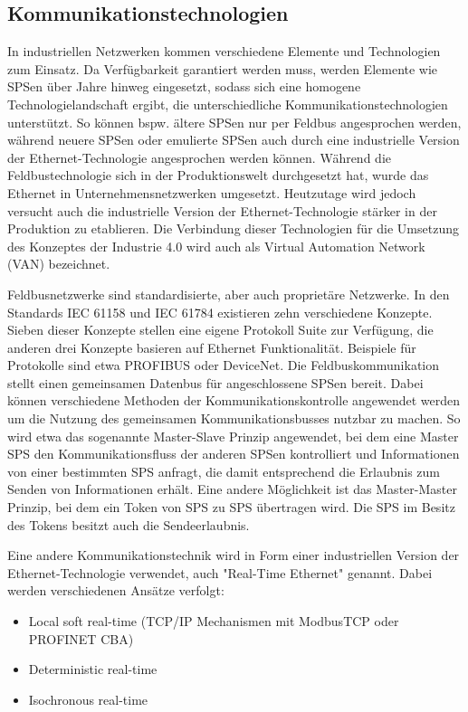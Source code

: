 \subsection{Kommunikationstechnologien}
In industriellen Netzwerken kommen verschiedene Elemente und Technologien zum Einsatz. Da Verfügbarkeit garantiert werden muss, werden Elemente wie SPSen über Jahre hinweg eingesetzt, sodass sich eine homogene Technologielandschaft ergibt, die unterschiedliche Kommunikationstechnologien unterstützt. So können bspw. ältere SPSen nur per Feldbus angesprochen werden, während neuere SPSen oder emulierte SPSen auch durch eine industrielle Version der Ethernet-Technologie angesprochen werden können. Während die Feldbustechnologie sich in der Produktionswelt durchgesetzt hat, wurde das Ethernet in Unternehmensnetzwerken umgesetzt. Heutzutage wird jedoch versucht auch die industrielle Version der Ethernet-Technologie stärker in der Produktion zu etablieren. Die Verbindung dieser Technologien für die Umsetzung des Konzeptes der Industrie 4.0 wird auch als Virtual Automation Network (VAN) bezeichnet.

Feldbusnetzwerke sind standardisierte, aber auch proprietäre Netzwerke. In den Standards IEC 61158 und IEC 61784 existieren zehn verschiedene Konzepte. Sieben dieser Konzepte stellen eine eigene Protokoll Suite zur Verfügung, die anderen drei Konzepte basieren auf Ethernet Funktionalität. Beispiele für Protokolle sind etwa PROFIBUS oder DeviceNet.
Die Feldbuskommunikation stellt einen gemeinsamen Datenbus für angeschlossene SPSen bereit. Dabei können verschiedene Methoden der Kommunikationskontrolle angewendet werden um die Nutzung des gemeinsamen Kommunikationsbusses nutzbar zu machen. So wird etwa das sogenannte Master-Slave Prinzip angewendet, bei dem eine Master SPS den Kommunikationsfluss der anderen SPSen kontrolliert und Informationen von einer bestimmten SPS anfragt, die damit entsprechend die Erlaubnis zum Senden von Informationen erhält. Eine andere Möglichkeit ist das Master-Master Prinzip, bei dem ein Token von SPS zu SPS übertragen wird. Die SPS im Besitz des Tokens besitzt auch die Sendeerlaubnis.

Eine andere Kommunikationstechnik wird in Form einer industriellen Version der Ethernet-Technologie verwendet, auch "Real-Time Ethernet" genannt. Dabei werden verschiedenen Ansätze verfolgt:
\begin{itemize}
\item Local soft real-time (TCP/IP Mechanismen mit ModbusTCP oder PROFINET CBA)
\item Deterministic real-time 
\item Isochronous real-time
\end{itemize}

